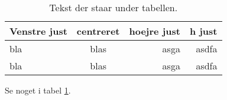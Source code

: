 \documentclass{article}
\begin{document}
\begin{table}
\centering
\begin{tabular}{l | c | r r}
Venstre just& centreret & hoejre just & h just	\\
\hline
bla			& blas		& asga 		  & asdfa	\\
bla			& blas		& asga 		  & asdfa
\end{tabular}
\caption{Tekst der staar under tabellen.}
\label{tabTabelOverHmm}
\end{table} 

Se noget i tabel \ref{tabTabelOverHmm}.
\end{document}
